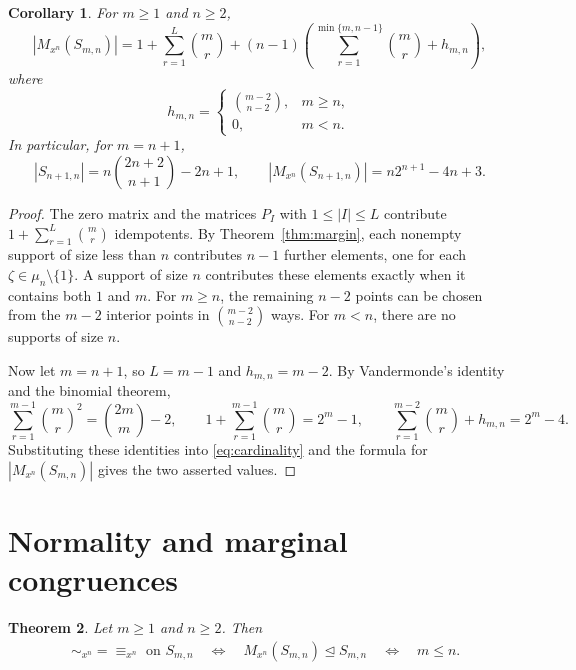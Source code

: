 \documentclass[11pt,a4paper,reqno]{amsart}
\newtheorem{theorem}{Theorem}[section]
\newtheorem{corollary}[theorem]{Corollary}
\newcommand{\Sn}{S_{m,n}}
\newcommand{\Mn}{M_{x^n}}
\numberwithin{equation}{section}
\begin{document}
\begin{corollary}\label{cor:count}
For $m\geq 1$ and $n\geq 2$,
$$
|\Mn(\Sn)|
=1+\sum_{r=1}^{L}\binom{m}{r}
 +(n-1)\left(
     \sum_{r=1}^{\min\{m,n-1\}}\binom{m}{r}+h_{m,n}
   \right),
$$
where
$$
h_{m,n}=
\begin{cases}
\displaystyle\binom{m-2}{n-2}, & m\geq n,\\
0, & m<n.
\end{cases}
$$
In particular, for $m=n+1$,
$$
|S_{n+1,n}|=n\binom{2n+2}{n+1}-2n+1,
\qquad
|\Mn(S_{n+1,n})|=n2^{n+1}-4n+3.
$$
\end{corollary}

\begin{proof}
The zero matrix and the matrices $P_I$ with $1\leq |I|\leq L$
contribute $1+\sum_{r=1}^{L}\binom{m}{r}$ idempotents. By
Theorem~\ref{thm:margin}, each nonempty support of size less than $n$
contributes $n-1$ further elements, one for each
$\zeta\in\mu_n\setminus\{1\}$. A support of size $n$ contributes
these elements exactly when it contains both $1$ and $m$.
For $m\geq n$, the remaining $n-2$ points can be chosen from the
$m-2$ interior points in $\binom{m-2}{n-2}$ ways. For $m<n$,
there are no supports of size $n$.

Now let $m=n+1$, so $L=m-1$ and $h_{m,n}=m-2$. By Vandermonde's
identity and the binomial theorem,
$$
\sum_{r=1}^{m-1}\binom{m}{r}^{2}=\binom{2m}{m}-2,\qquad
1+\sum_{r=1}^{m-1}\binom{m}{r}=2^m-1,\qquad
\sum_{r=1}^{m-2}\binom{m}{r}+h_{m,n}=2^m-4.
$$
Substituting these identities into \eqref{eq:cardinality} and the
formula for $|\Mn(\Sn)|$ gives the two asserted values.
\end{proof}

\section{Normality and marginal congruences}\label{sec:normality}

\begin{theorem}\label{thm:normality}
Let $m\ge1$ and $n\ge2$. Then
\[
\begin{aligned}
&\sim_{x^n}=\equiv_{x^n} \text{ on }\Sn \quad\Longleftrightarrow\quad \Mn(\Sn)\trianglelefteq\Sn \quad\Longleftrightarrow\quad m\le n.
\end{aligned}
\]
\end{theorem}
\end{document}
